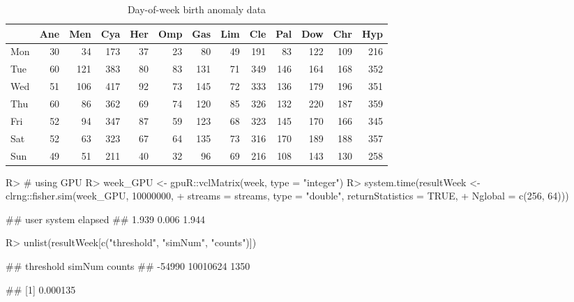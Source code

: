 \documentclass[article,nojss]{jss}\usepackage[]{graphicx}\usepackage[]{color}
\begin{document}
\begin{table}

\caption{\label{tab:weekdata}Day-of-week birth anomaly data\label{tab:week}}
\centering
\begin{tabular}[t]{lrrrrrrrrrrrr}
\toprule
  & Ane & Men & Cya & Her & Omp & Gas & Lim & Cle & Pal & Dow & Chr & Hyp\\
\midrule
Mon & 30 & 34 & 173 & 37 & 23 & 80 & 49 & 191 & 83 & 122 & 109 & 216\\
Tue & 60 & 121 & 383 & 80 & 83 & 131 & 71 & 349 & 146 & 164 & 168 & 352\\
Wed & 51 & 106 & 417 & 92 & 73 & 145 & 72 & 333 & 136 & 179 & 196 & 351\\
Thu & 60 & 86 & 362 & 69 & 74 & 120 & 85 & 326 & 132 & 220 & 187 & 359\\
Fri & 52 & 94 & 347 & 87 & 59 & 123 & 68 & 323 & 145 & 170 & 166 & 345\\
Sat & 52 & 63 & 323 & 67 & 64 & 135 & 73 & 316 & 170 & 189 & 188 & 357\\
Sun & 49 & 51 & 211 & 40 & 32 & 96 & 69 & 216 & 108 & 143 & 130 & 258\\
\bottomrule
\end{tabular}
\end{table}


\begin{CodeChunk}
\begin{CodeInput}
R> # using GPU
R> week_GPU <- gpuR::vclMatrix(week, type = "integer")
R> system.time(resultWeek <- clrng::fisher.sim(week_GPU, 10000000,
+    streams = streams, type = "double", returnStatistics = TRUE,
+    Nglobal = c(256, 64)))
\end{CodeInput}
\begin{CodeOutput}
##    user  system elapsed 
##   1.939   0.006   1.944
\end{CodeOutput}
\begin{CodeInput}
R> unlist(resultWeek[c("threshold", "simNum", "counts")])
\end{CodeInput}
\begin{CodeOutput}
## threshold    simNum    counts 
##    -54990  10010624      1350
\end{CodeOutput}
\begin{CodeOutput}
## [1] 0.000135
\end{CodeOutput} 
\end{CodeChunk} 
\end{document}
